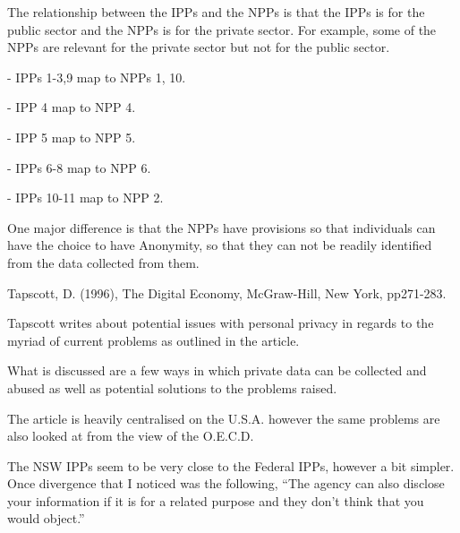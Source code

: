 The relationship between the IPPs and the NPPs is that the IPPs is for the public sector and the NPPs is for the private sector. For example, some of the NPPs are relevant for the private sector but not for the public sector.


\item - IPPs 1-3,9 map to NPPs 1, 10.
\item - IPP 4 map to NPP 4.
\item - IPP 5 map to NPP 5.
\item - IPPs 6-8 map to NPP 6.
\item - IPPs 10-11 map to NPP 2.


One major difference is that the NPPs have provisions so that individuals can have the choice to have Anonymity, so that they can not be readily identified from the data collected from them.





Tapscott, D. (1996), The Digital Economy, McGraw-Hill, New York, pp271-283.


Tapscott writes about potential issues with personal privacy in regards to the myriad of current problems as outlined in the article.

What is discussed are a few ways in which private data can be collected and abused as well as potential solutions to the problems raised.

The article is heavily centralised on the U.S.A. however the same problems are also looked at from the view of the O.E.C.D.




The NSW IPPs seem to be very close to the Federal IPPs, however a bit simpler. Once divergence that I noticed was the following, ``The agency can also disclose your information if it is for a related purpose and they don't think that you would object.''

